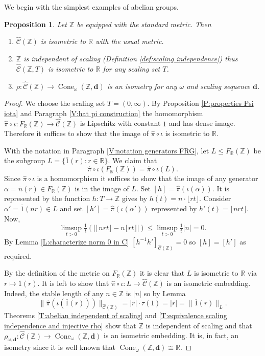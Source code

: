 \documentclass[12pt]{amsart}
\newtheorem{prop}{Proposition}[section]
\theoremstyle{definition}
\def\RR{\ensuremath{\mathbb{R}}}
\def\ZZ{\ensuremath{\mathbb{Z}}}
\newcommand{\B}[1]{\mathbf{#1}}
\newcommand{\OP}[1]{\operatorname{#1}}
\def\Cone{\OP{Cone}}
\def\Free{F}
\def\tC{\hat{\mathcal{C}}}
\newcommand{\Myfloor}[1]{\lfloor #1 \rfloor}
\begin{document}
We begin with the simplest examples of abelian groups.


\begin{prop}\label{prop:tCZ} %
Let $\ZZ$ be equipped with the standard metric.
Then 
\begin{enumerate}[label=(\alph*)]
\item
$\tC(\ZZ)$ is isometric to $\RR$ with the usual metric.

\item
$\ZZ$ is independent of scaling (Definition \ref{def:scaling independence}) thus $\tC(\ZZ,T)$ is isometric to $\RR$ for any scaling set $T$.

\item
$\rho \colon \tC(\ZZ) \to \Cone_\omega(\ZZ,\B d)$ is an isometry for any $\omega$ and scaling sequence  $\B d$.
\end{enumerate}
\end{prop}

\begin{proof}
We choose the scaling set $T=(0,\infty)$.
By Proposition \ref{P:properties Psi iota} and Paragraph \ref{V:hat pi construction} the homomorphism $\hat{\pi} \circ \iota \colon \Free_\RR(\ZZ) \to \tC(\ZZ)$ is Lipschitz with constant $1$ and has dense image.
Therefore it suffices to show that the image of $\hat{\pi}\circ \iota$ is isometric to $\RR$.

With the notation in Paragraph \ref{V:notation generators FRG}, let $L \leq \Free_\RR(\ZZ)$ be the subgroup $L=\{ \overline{1}(r) : r \in \RR\}$.
We claim that
\[
\hat{\pi}\circ \iota(\Free_\RR(\ZZ)) = \hat{\pi} \circ \iota(L).
\]
Since $\hat{\pi} \circ \iota$ is a homomorphism it suffices to show that the image of any generator $\alpha = \overline{n}(r) \in \Free_\RR(\ZZ)$ is in the image of $L$.
Set $[h]=\hat{\pi}(\iota(\alpha))$.
It is represented by the function $h \colon T \to \ZZ$ gives by $h(t)=n \cdot \Myfloor{rt}$.
Consider $\alpha'=\overline{1}(nr) \in L$ and set $[h']=\hat{\pi}(\iota(\alpha'))$ represented by $h'(t)=\Myfloor{nrt}$.
Now,
\[
\limsup_{t>0} \tfrac{1}{t} (|\Myfloor{nrt}-n\Myfloor{rt}|) \leq
\limsup_{t>0} \tfrac{1}{t} |n| = 0.
\]
By Lemma \ref{L:characterize norm 0 in C} $[h^{-1}h']_{\tC(\ZZ)}=0$ so $[h]=[h']$ as required.

By the definition of the metric on $\Free_\RR(\ZZ)$ it is clear that $L$ is isometric to $\RR$ via $r \mapsto \overline{1}(r)$.
It is left to show that $\hat{\pi} \circ \iota \colon L \to \tC(\ZZ)$ is an isometric embedding.
Indeed, the stable length of any $n \in \ZZ$ is $|n|$ so by Lemma
\[
\| \hat{\pi}(\iota(\overline{1}(r))) \|_{\tC(\ZZ)} = |r| \cdot \tau(1) = |r| = \| \overline{1}(r)\|_L.
\]
Theorems \ref{T:abelian independent of scaling} and \ref{T:equivalence scaling independence and injective rho} show that $\ZZ$ is independent of scaling and that $\rho_{\omega,\B d} \colon \tC(\ZZ) \to \Cone_\omega(\ZZ,\B d)$ is an isometric embedding.
It is, in fact, an isometry since it is well known that $\Cone_\omega(\ZZ,\B d) \cong \RR$.
\end{proof}
\end{document}
